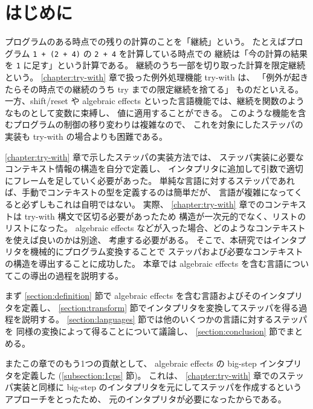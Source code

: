 \section{はじめに}
\label{section:algebraic effects__intro}

プログラムのある時点での残りの計算のことを「継続」という。
たとえばプログラム \texttt{1 + (2 + 4)} の \texttt{2 + 4} を計算している時点での
継続は「今の計算の結果を \texttt{1} に足す」という計算である。
継続のうち一部を切り取った計算を限定継続という。
\ref{chapter:try-with} 章で扱った例外処理機能 try-with は、
「例外が起きたらその時点での継続のうち try までの限定継続を捨てる」
ものだといえる。
一方、shift/reset \cite{DF1990} や algebraic effects \cite{PRETNAR201519}
といった言語機能では、継続を関数のようなものとして変数に束縛し、
値に適用することができる。
このような機能を含むプログラムの制御の移り変わりは複雑なので、
これを対象にしたステッパの実装も try-with の場合よりも困難である。

\ref{chapter:try-with} 章で示したステッパの実装方法では、
ステッパ実装に必要なコンテキスト情報の構造を自分で定義し、
インタプリタに追加して引数で適切にフレームを足していく必要があった。
単純な言語に対するステッパであれば、手動でコンテキストの型を定義するのは簡単だが、
言語が複雑になってくると必ずしもこれは自明ではない。
実際、 \ref{chapter:try-with} 章でのコンテキストは try-with 構文で区切る必要があったため
構造が一次元的でなく、リストのリストになった。
algebraic effects などが入った場合、どのようなコンテキストを使えば良いのかは別途、
考慮する必要がある。
そこで、本研究ではインタプリタを機械的にプログラム変換することで
ステッパおよび必要なコンテキストの構造を導出することに成功した。
本章では algebraic effects を含む言語についてこの導出の過程を説明する。

まず \ref{section:definition} 節で algebraic effects を含む言語およびそのインタプリタを定義し、
\ref{section:transform} 節でインタプリタを変換してステッパを得る過程を説明する。
\ref{section:languages} 節では他のいくつかの言語に対するステッパを
同様の変換によって得ることについて議論し、
\ref{section:conclusion} 節でまとめる。

またこの章でのもう1つの貢献として、
algebraic effects の big-step インタプリタを定義した (\ref{subsection:1cps} 節)。
これは、 \ref{chapter:try-with} 章でのステッパ実装と同様に
big-step のインタプリタを元にしてステッパを作成するというアプローチをとったため、
元のインタプリタが必要になったからである。
